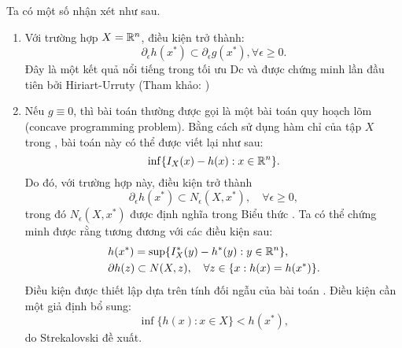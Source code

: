 \documentclass[a4paper]{report}
\begin{document}
    \begin{remark}
        Ta có một số nhận xét như sau.
        \begin{enumerate}[label=(\roman*)]
            \item Với trường hợp $X = \mathbb{R}^n$, điều kiện  trở thành:
            \begin{equation}
                \partial_{\epsilon}h(x^*) \subset \partial_{\epsilon}g(x^*), \forall \epsilon \geq 0.
            \end{equation}
            Đây là một kết quả nổi tiếng trong tối ưu Dc và được chứng minh lần đầu tiên bởi Hiriart-Urruty (Tham khảo: \cite{hiriart1985generalized})
            \item Nếu $g \equiv 0$, thì bài toán  thường được gọi là một bài toán quy hoạch lõm (concave programming problem). Bằng cách sử dụng hàm chỉ của tập $X$ trong , bài toán này có thể được viết lại như sau:
            \begin{equation}
                \label{q:dc_programming_gh_convex_2}
                \inf\{I_X(x) - h(x): x \in \mathbb{R}^n\}.
            \end{equation}
            Do đó, với trường hợp này, điều kiện  trở thành 
            \begin{equation}
                \label{eq:subgradient_optim_cond_gh_convex_2}
                \partial_{\epsilon}h(x^*) \subset N_\epsilon(X, x^*), \quad \forall \epsilon \geq 0,
            \end{equation}
            trong đó $N_\epsilon(X, x^*)$ được định nghĩa trong Biểu thức . Ta có thể chứng minh được rằng  tương đương với các điều kiện sau:
            \begin{align}
                \label{eq:subgradient_optim_cond_gh_convex_3}
                &h(x^*) = \sup\{I^*_X(y) - h^*(y): y \in \mathbb{R}^n\},\\
                \label{eq:subgradient_optim_cond_gh_convex_4} 
                &\partial h(z) \subset N(X, z), \quad \forall z \in \{x: h(x) = h(x^*)\}.
            \end{align}
            Điều kiện  được thiết lập dựa trên tính đối ngẫu của bài toán . Điều kiện  cần một giả định bổ sung:
            \begin{equation}
                \inf\{h(x): x \in X\} < h(x^*),
            \end{equation}
            do Strekalovski đề xuất.
        \end{enumerate}
    \end{remark}
\end{document}
